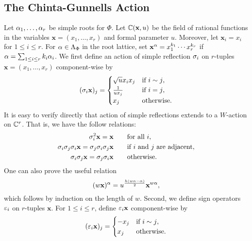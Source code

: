 \documentclass[12pt,reqno,oneside]{amsart}
\begin{document}
    \subsection*{The Chinta-Gunnells Action}
        Let $\alpha_{1},\ldots,\alpha_{r}$ be simple roots for $\Phi$. Let $\mathbb{C}(\mathbf{x},u)$ be the field of rational functions in the variables $\mathbf{x} = (x_{1},\ldots,x_{r})$ and formal parameter $u$. Moreover, let $\mathbf{x}_{i} = x_{i}$ for $1 \le i \le r$. For $\alpha \in \Lambda_{\Phi}$ in the root lattice, set $\mathbf{x}^{\alpha} = x_{1}^{k_{1}} \cdots x_{r}^{k_{r}}$ if $\alpha = \sum_{1 \le i \le r}k_{i}\alpha_{i}$. We first define an action of simple reflection $\sigma_{i}$ on $r$-tuples $\mathbf{x} = (x_{1},\ldots,x_{r})$ component-wise by
        \[
            (\sigma_{i}\mathbf{x})_{j} = \begin{cases} \sqrt{u}x_{i}x_{j} & \text{if $i \sim j$}, \\ \frac{1}{ux_{j}} & \text{if $i = j$}, \\ x_{j} & \text{otherwise}. \end{cases}
        \]
        It is easy to verify directly that action of simple reflections extends to a $W$-action on $\mathbb{C}^{r}$. That is, we have the follow relations:
        \begin{equation}\label{equ:relations_for_action_of_simple_reflections_on_tuples}
            \begin{aligned}
                \sigma_{i}^{2}\mathbf{x} = \mathbf{x} \qquad &\text{for all $i$}, \\
                \sigma_{i}\sigma_{j}\sigma_{i}\mathbf{x} = \sigma_{j}\sigma_{i}\sigma_{j}\mathbf{x} \qquad &\text{if $i$ and $j$ are adjacent}, \\
                \sigma_{i}\sigma_{j}\mathbf{x} = \sigma_{j}\sigma_{i}\mathbf{x} \qquad &\text{otherwise}.
            \end{aligned}
        \end{equation}
        One can also prove the useful relation
        \begin{equation}\label{equ:useful_relation}
            (w\mathbf{x})^{\alpha} = u^{\frac{h(w\alpha-\alpha)}{2}}\mathbf{x}^{w\alpha},
        \end{equation}
        which follows by induction on the length of $w$. Second, we define sign operators $\varepsilon_{i}$ on $r$-tuples $\mathbf{x}$. For $1 \le i \le r$, define $\varepsilon_{i}\mathbf{x}$ component-wise by
        \[
            (\varepsilon_{i}\mathbf{x})_{j} = \begin{cases} -x_{j} & \text{if $i \sim j$}, \\ x_{j} & \text{otherwise}. \end{cases}
        \]
\end{document}
